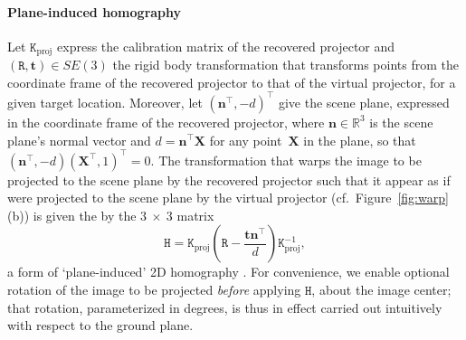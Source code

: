 \documentclass[review]{elsarticle}
\begin{document}
\paragraph{Plane-induced homography} Let $\mathtt{K}_\text{proj}$ express the calibration matrix of the recovered projector and $(\mathtt{R}, \mathbf{t}) \in SE(3)$ the rigid body transformation that transforms points from the coordinate frame of the recovered projector to that of the virtual projector, for a given target location. Moreover, let $(\mathbf{n}^\top, -d)^\top$ give the scene plane, expressed in the coordinate frame of the recovered projector, where $\mathbf{n} \in \mathbb{R}^3$ is the scene plane's normal vector and $d = \mathbf{n}^\top\mathbf{X}$ for any point~$\mathbf{X}$ in the plane, so that $(\mathbf{n}^\top, -d) (\mathbf{X}^\top, 1)^\top = 0$. The transformation that warps the image to be projected to the scene plane by the recovered projector such that it appear as if were projected to the scene plane by the virtual projector (cf.\ Figure~\ref{fig:warp}(b)) is given the by the $3~\times~3$ matrix
\begin{equation}
\mathtt{H} = \mathtt{K}_\text{proj}\left(\mathtt{R} - \frac{\mathbf{t}\mathbf{n}^\top}{d}\right)\mathtt{K}_\text{proj}^{-1},
\label{homgen}
\end{equation}
a form of `plane-induced' 2D homography \cite{Hartley2004}. For convenience, we enable optional rotation of the image to be projected \textit{before} applying $\mathtt{H}$, about the image center; that rotation, parameterized in degrees, is thus in effect carried out intuitively with respect to the ground plane.
\end{document}
